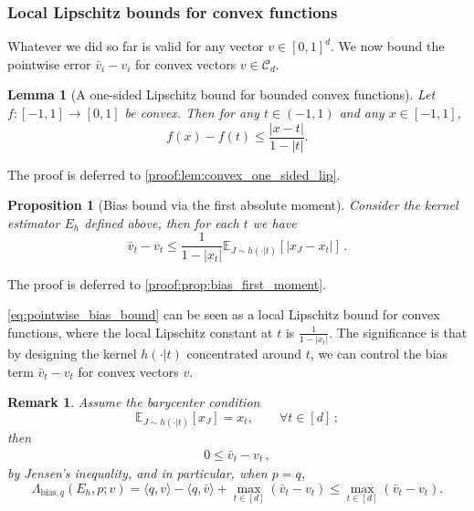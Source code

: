 \documentclass{article}
\theoremstyle{plain}
\newtheorem{lemma}[theorem]{Lemma}
\newtheorem{proposition}[theorem]{Proposition}
\theoremstyle{definition}
\theoremstyle{plain}
\newtheorem{remark}[theorem]{Remark}
\newcommand{\E}{\mathbb E}
\newcommand{\cC}{\mathcal C}
\begin{document}
\subsubsection{Local Lipschitz bounds for convex functions}
Whatever we did so far is valid for any vector $v\in[0,1]^d$.
We now bound the pointwise error $\bar v_i-v_i$ for convex vectors $v\in\cC_d$.
\begin{lemma}[A one-sided Lipschitz bound for bounded convex functions]
    \label{lem:convex_one_sided_lip}
    Let $f:[-1,1]\to[0,1]$ be convex. Then for any $t\in(-1,1)$ and any $x\in[-1,1]$,
    \begin{equation}
        f(x)-f(t) \le \frac{|x-t|}{1-|t|}.
        \label{eq:convex_one_sided_lip}
    \end{equation}
\end{lemma}
\noindent The proof is deferred to \ref{proof:lem:convex_one_sided_lip}.

\begin{proposition}[Bias bound via the first absolute moment]
    \label{prop:bias_first_moment}
    Consider the kernel estimator $E_h$ defined above, then for each $t$ we have
    \begin{equation}
        \bar v_t - v_t
        \le \frac{1}{1-|x_t|}\E_{J\sim h(\cdot|t)}\left[|x_J-x_t|\right]\,.
        \label{eq:pointwise_bias_bound}
    \end{equation}
\end{proposition}
\noindent The proof is deferred to \ref{proof:prop:bias_first_moment}.

\eqref{eq:pointwise_bias_bound} can be seen as a local Lipschitz bound for convex functions, where the local Lipschitz constant at $t$ is $\frac{1}{1-|x_t|}$.
The significance is that by designing the kernel $h(\cdot|t)$ concentrated around $t$, we can control the bias term $\bar v_t-v_t$ for convex vectors $v$.

\begin{remark}
    Assume the \emph{barycenter condition}
    \begin{equation}
        \E_{J\sim h(\cdot|t)}[x_J] = x_t,\qquad \forall t\in[d]\,;
        \label{eq:barycenter_condition}
    \end{equation}
    then
    \begin{align}
        0 \le \bar v_t - v_t\,,
    \end{align}
    by Jensen's inequality, and in particular, when $p=q$,
    \begin{equation}
        \Lambda_{\mathrm{bias},q}(E_h,p;v)
        = \langle q,v\rangle-\langle q,\bar v\rangle + \max_{t\in[d]}(\bar v_t-v_t)
        \le \max_{t\in[d]}(\bar v_t-v_t).
        \label{eq:Lambda_bias_bound_by_max}
    \end{equation}
\end{remark}
\end{document}
